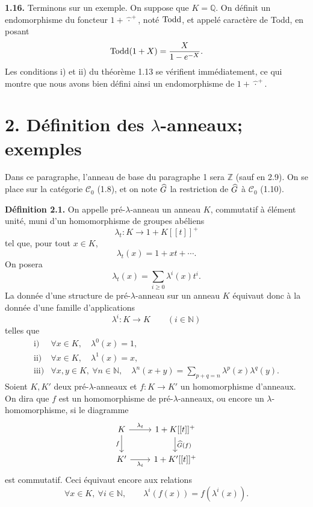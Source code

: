 \documentclass[11pt]{article}
\begin{document}
\textbf{1.16.} Terminons sur un exemple. On suppose que \(K=\mathbb Q\). On définit un endomorphisme du foncteur \(1+\widehat{\,\cdot\,}^{+}\), noté \(\operatorname{Todd}\), et appelé caractère de Todd, en posant
\[
  \operatorname{Todd}(1+X)=\frac{X}{1-e^{-X}}.
\]
Les conditions i) et ii) du théorème 1.13 se vérifient immédiatement, ce qui montre que nous avons bien défini ainsi un endomorphisme de \(1+\widehat{\,\cdot\,}^{+}\).

\section*{2. Définition des \(\lambda\)-anneaux; exemples}

Dans ce paragraphe, l'anneau de base du paragraphe 1 sera \(\mathbb Z\) (sauf en 2.9). On se place sur la catégorie \(\mathcal C_0\) (1.8), et on note \(\widehat G\) la restriction de \(\widehat G\) à \(\mathcal C_0\) (1.10).

\textbf{Définition 2.1.} On appelle pré-\(\lambda\)-anneau un anneau \(K\), commutatif à élément unité, muni d'un homomorphisme de groupes abéliens
\[
  \lambda_t:K\longrightarrow1+K[[t]]^+
\]
tel que, pour tout \(x\in K\),
\[
  \lambda_t(x)=1+xt+\cdots.
\]
On posera
\[
  \lambda_t(x)=\sum_{i\geq0}\lambda^i(x)t^i.
\]
La donnée d'une structure de pré-\(\lambda\)-anneau sur un anneau \(K\) équivaut donc à la donnée d'une famille d'applications
\[
  \lambda^i:K\longrightarrow K\qquad (i\in\mathbb N)
\]
telles que
\[
\begin{array}{ll}
\text{i)}& \forall x\in K,\quad \lambda^0(x)=1,\\[0.3em]
\text{ii)}& \forall x\in K,\quad \lambda^1(x)=x,\\[0.3em]
\text{iii)}& \forall x,y\in K,\ \forall n\in\mathbb N,\quad
\lambda^n(x+y)=\displaystyle\sum_{p+q=n}\lambda^p(x)\lambda^q(y).
\end{array}
\]
Soient \(K,K'\) deux pré-\(\lambda\)-anneaux et \(f:K\to K'\) un homomorphisme d'anneaux. On dira que \(f\) est un homomorphisme de pré-\(\lambda\)-anneaux, ou encore un \(\lambda\)-homomorphisme, si le diagramme
\[
\begin{tikzcd}
K \arrow[r,"\lambda_t"] \arrow[d,"f"'] &
1+K[[t]]^+ \arrow[d,"\Ghat(f)"]\\
K' \arrow[r,"\lambda_t"'] &
1+K'[[t]]^+
\end{tikzcd}
\]
est commutatif. Ceci équivaut encore aux relations
\[
  \forall x\in K,\ \forall i\in\mathbb N,\qquad
  \lambda^i(f(x))=f(\lambda^i(x)).
\]
\end{document}
